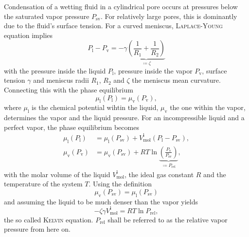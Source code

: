 \documentclass[../thesis.tex]{subfiles}
\begin{document}
      Condensation of a wetting fluid in a cylindrical pore occurs at pressures below the saturated vapor pressure $P_\mathrm{sv}$. For relatively large pores, this is dominantly due to the fluid's surface tension. For a curved meniscus, \textsc{Laplace-Young} equation implies
      \begin{equation*}
        P_\mathrm{l}-P_\mathrm{v}=-\gamma\underbrace{\left(\frac{1}{R_1}+\frac{1}{R_2}\right)}_{\coloneqq\zeta}
      \end{equation*}
      with the pressure inside the liquid $P_\mathrm{l}$, pressure inside the vapor $P_\mathrm{v}$, surface tension $\gamma$ and meniscus radii $R_1$, $R_2$ and $\zeta$ the meniscus mean curvature.
      Connecting this with the phase equilibrium
      \begin{equation*}
        \mu_\mathrm{l}(P_\mathrm{l})=\mu_\mathrm{v}(P_\mathrm{v}),
      \end{equation*}
      where $\mu_\mathrm{l}$ is the chemical potential wihtin the liquid, $\mu_\mathrm{v}$ the one within the vapor, determines the vapor and the liquid pressure. For an incompressible liquid and a perfect vapor, the phase equilibrium becomes
      \begin{align*}
        \mu_\mathrm{l}(P_\mathrm{l}) &= \mu_\mathrm{l}(P_\mathrm{sv})+V_\mathrm{mol}^\mathrm{l}(P_\mathrm{l}-P_\mathrm{sv}),  \\
        \mu_\mathrm{v}(P_\mathrm{v}) &= \mu_\mathrm{v}(P_\mathrm{sv})+RT\ln\underbrace{\left( \frac{P_\mathrm{v}}{P_\mathrm{sv}}\right)}_{\coloneqq P_\mathrm{rel}},
      \end{align*}
      with the molar volume of the liquid $V_\mathrm{mol}^\mathrm{l}$, the ideal gas constant $R$ and the temperature of the system $T$. Using the definition
      \begin{equation*}
        \mu_\mathrm{v}(P_\mathrm{sv})=\mu_\mathrm{l}(P_\mathrm{sv})
      \end{equation*}
      and assuming the liquid to be much denser than the vapor yields
      \begin{equation}
        -\zeta\gamma V_\mathrm{mol}^\mathrm{l}= RT\ln P_\mathrm{rel},
      \end{equation}
      the so called \textsc{Kelvin} equation. $P_\mathrm{rel}$ shall be referred to as the relative vapor pressure from here on.
      \medskip

      
\end{document}
